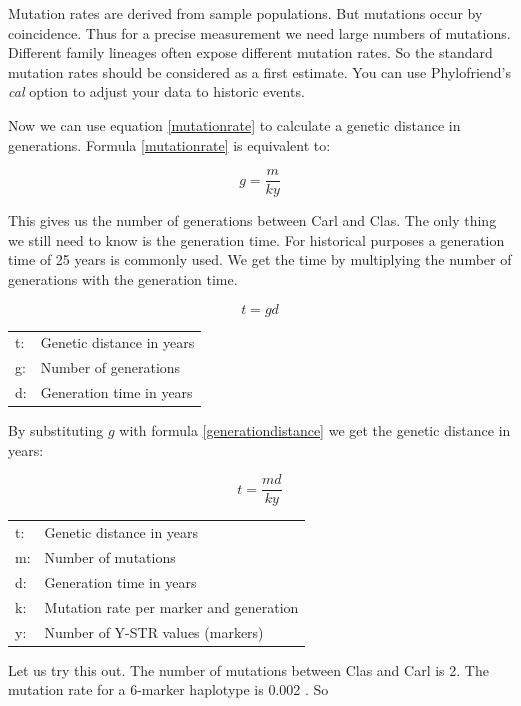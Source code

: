 Mutation rates are derived from sample populations. But
mutations occur by coincidence. Thus for a precise measurement
we need large numbers of mutations. Different family lineages
often expose different mutation rates. So the standard mutation
rates should be considered as a first estimate. You can use
Phylofriend's \emph{cal} option to adjust your data to
historic events.

Now we can use equation \ref{mutationrate} to calculate a
genetic distance in generations. Formula \ref{mutationrate}
is equivalent to:

\begin{equation}
g = \frac{m}{k y} \label{generationdistance}
\end{equation}

This gives us the number of generations between Carl and Clas.
The only thing we still need to know is the generation time.
For historical purposes a generation time of 25 years is
commonly used. We get the time by multiplying the number
of generations with the generation time.

\begin{equation}
t = g d           \label{generationtime}
\end{equation}

\begin{tabular}{ll}
t: &  Genetic distance in years\\
g: &  Number of generations \\
d: &  Generation time in years
\end{tabular}
\vspace{1em}

By substituting $g$ with formula \ref{generationdistance}
we get the genetic distance in years:

\begin{equation}
t = \frac{m d}{k y} \label{timedistance}
\end{equation}

\begin{tabular}{ll}
t: &  Genetic distance in years\\
m: &  Number of mutations \\
d: &  Generation time in years\\
k: &  Mutation rate per marker and generation\\
y: &  Number of Y-STR values (markers)
\end{tabular}
\vspace{1em}

Let us try this out. The number of mutations between Clas
and Carl is 2. The mutation rate for a 6-marker haplotype
is 0.002 \cite{Kly09}. So

